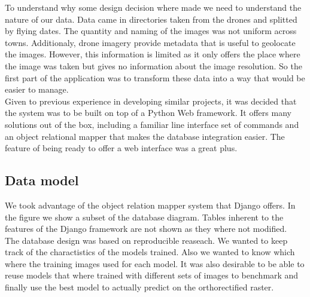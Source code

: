 To understand why some design decision where made we need to understand the nature of our data. Data came in directories taken from the drones and splitted by flying dates. The quantity and naming of the images was not uniform across towns. Additionaly, drone imagery provide metadata that is useful to geolocate the images. However, this information is limited as it only offers the place where the image was taken but gives no information about the image resolution. So the first part of the application was to transform these data into a way that would be easier to manage.\\

Given to previous experience in developing similar projects, it was decided that the system was to be built on top of a Python Web framework. It offers many solutions out of the box, including a familiar line interface set of commands and an object relational mapper that makes the database integration easier. The feature of being ready to offer a web interface was a great plus.\\

\subsection{Data model}

We took advantage of the object relation mapper system that Django offers. In the figure \cite{fig:database} we show a subset of the database diagram. Tables inherent to the features of the Django framework are not shown as they where not modified.\\

The database design was based on reproducible reaseach. We wanted to keep track of the charactistics of the models trained. Also we wanted to know which where the training images used for each model. It was also desirable to be able to reuse models that where trained with different sets of images to benchmark and finally use the best model to actually predict on the orthorectified raster.\\



